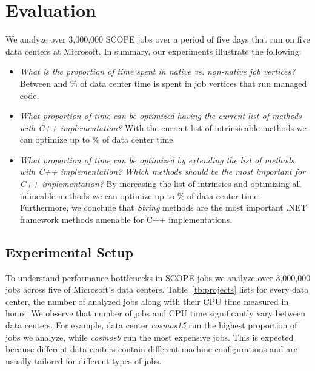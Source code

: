\section{Evaluation}
We analyze over 3,000,000 SCOPE jobs over a period of five days that run on five data centers at Microsoft. 
In summary, our experiments illustrate the following:

\begin{itemize}
\item \emph{What is the proportion of time spent in native vs. non-native job vertices?}
Between \nonNativeTimeL{} and \nonNativeTimeU \% of data center time is spent in job vertices that run managed code.

\item \emph{What proportion of time can be optimized having the current list of methods with C++ implementation?} 
With the current list of intrinsicable methods we can optimize up to \optimizableU{} \% of data center time.

\item \emph{What proportion of time can be optimized by extending the list of methods with C++ implementation? 
Which methods should be the most important for C++ implementation?}
By increasing the list of intrinsics and optimizing all inlineable methods we can optimize up to \potentiallyOptimizableU{} \% of data center time. 
Furthermore, we conclude that \emph{String} methods are the most important .NET framework methods amenable for C++ implementations.


\end{itemize}

\subsection{Experimental Setup}
To understand performance bottlenecks in SCOPE jobs we analyze over 3,000,000 jobs across five of Microsoft's data centers.
Table~\ref{tb:projects} lists for every data center, the number of analyzed jobs along with their CPU time measured in hours.
We observe that number of jobs and CPU time significantly vary between data centers. 
For example, data center \emph{cosmos15} run the highest proportion of jobs we analyze, while \emph{cosmos9} run the most expensive jobs. 
This is expected because different data centers contain different machine configurations and are usually tailored for different types of jobs. 

